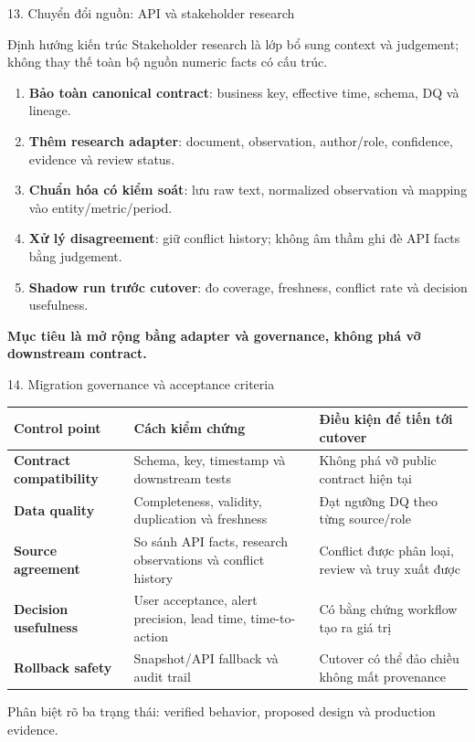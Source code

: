 \documentclass[aspectratio=169,11pt]{beamer}
\newcommand{\warn}[1]{\textcolor{fdorange}{\textbf{#1}}}
\begin{document}
\begin{frame}{13. Chuyển đổi nguồn: API và stakeholder research}
  \begin{alertblock}{Định hướng kiến trúc}
    Stakeholder research là lớp bổ sung context và judgement; không thay thế toàn bộ nguồn numeric facts có cấu trúc.
  \end{alertblock}
  \vspace{.2em}
  \scriptsize
  \begin{enumerate}
    \item \textbf{Bảo toàn canonical contract}: business key, effective time, schema, DQ và lineage.
    \item \textbf{Thêm research adapter}: document, observation, author/role, confidence, evidence và review status.
    \item \textbf{Chuẩn hóa có kiểm soát}: lưu raw text, normalized observation và mapping vào entity/metric/period.
    \item \textbf{Xử lý disagreement}: giữ conflict history; không âm thầm ghi đè API facts bằng judgement.
    \item \textbf{Shadow run trước cutover}: đo coverage, freshness, conflict rate và decision usefulness.
  \end{enumerate}
  \centering\small\warn{Mục tiêu là mở rộng bằng adapter và governance, không phá vỡ downstream contract.}
\end{frame}

\begin{frame}{14. Migration governance và acceptance criteria}
  \scriptsize
  \renewcommand{\arraystretch}{1.45}
  \begin{tabularx}{\textwidth}{>{\bfseries}p{} X p{}}
    Control point & Cách kiểm chứng & Điều kiện để tiến tới cutover\\\midrule
    Contract compatibility & Schema, key, timestamp và downstream tests & Không phá vỡ public contract hiện tại\\
    Data quality & Completeness, validity, duplication và freshness & Đạt ngưỡng DQ theo từng source/role\\
    Source agreement & So sánh API facts, research observations và conflict history & Conflict được phân loại, review và truy xuất được\\
    Decision usefulness & User acceptance, alert precision, lead time, time-to-action & Có bằng chứng workflow tạo ra giá trị\\
    Rollback safety & Snapshot/API fallback và audit trail & Cutover có thể đảo chiều không mất provenance\\
  \end{tabularx}
  \vfill
  \centering\small\textcolor{fdink!70}{Phân biệt rõ ba trạng thái: verified behavior, proposed design và production evidence.}
\end{frame}
\end{document}
